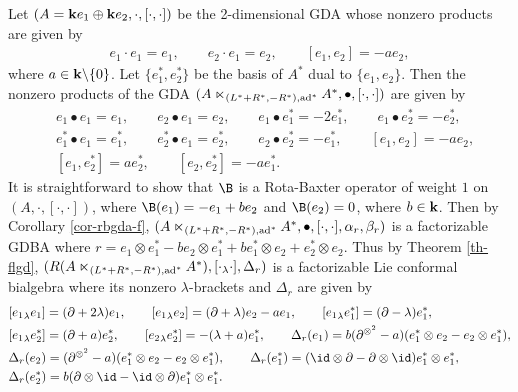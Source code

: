 \documentclass[12pt]{amsart}
\begin{document}
            \begin{example}
                Let $(A={\bf k}e_1\oplus{\bf k}e_2, \cdot,[\cdot,\cdot])$ be the 2-dimensional GDA whose nonzero products are given by
                \begin{align*}
                    e_1\cdot e_1=e_1,\qquad e_2\cdot e_1=e_2,\qquad [e_1,e_2]=-a e_2,
                \end{align*}
                where $a\in {\bf k}\backslash \{0\}$.  Let $\{e_1^*,e_2^*\}$ be the basis of $A^*$ dual to $\{e_1,e_2\}$. Then the nonzero products of  the GDA $(A\ltimes_{(L^*+R^*,-R^*),{\rm ad}^*}A^*, \bullet,[\cdot,\cdot])$ are given by
{\small                \begin{align*}
                    &e_1\bullet e_1=e_1,\qquad e_2\bullet e_1=e_2,\qquad e_1\bullet e_1^*=-2e_1^*,\qquad  e_1\bullet e_2^*=-e_2^*,\\
                    &e_1^*\bullet e_1=e_1^*,\qquad e_2^*\bullet e_1= e_2^*,\qquad e_2\bullet e_2^*=-e_1^*,\qquad [e_1,e_2]=-a e_2, \\
                    &[e_1,e_2^*]=ae_2^*,\qquad [e_2,e_2^*]=-ae_1^*.
                \end{align*}}
                It is straightforward to show that $\B$ is a Rota-Baxter operator of weight
                $1$ on $(A, \cdot,[\cdot,\cdot])$, where $\B(e_1)=-e_1+be_2$ and $\B(e_2)=0$, where $b\in {\bf k}$.
                Then by Corollary \ref{cor-rbgda-f},
                $(A\ltimes_{(L^*+R^*,-R^*),{\rm ad}^*}A^*, \bullet,[\cdot,\cdot],\alpha_r,\beta_r)$ is a factorizable GDBA where  $r=e_1\otimes e_1^*-b e_2\otimes e_1^*+b e_1^*\otimes e_2+e_2^*\otimes e_2$. Thus by Theorem \ref{th-flgd}, $(R(A\ltimes_{(L^*+R^*,-R^*),{\rm ad}^*}A^*),[\cdot_\lambda \cdot],\Delta_r )$ is a factorizable Lie conformal bialgebra where its nonzero $\lambda$-brackets and $\Delta_r$ are given by
                {\small
                \begin{align*}
                    &[{e_1}_\lambda e_1]=(\partial+2\lambda )e_1,\qquad [{e_1}_\lambda e_2]=(\partial+\lambda)e_2-ae_1,\qquad [{e_1}_\lambda e_1^*]=(\partial-\lambda )e_1^*,\\
                    &[{e_1}_\lambda e_2^*]=(\partial+a)e_2^*,\qquad [{e_2}_\lambda e_2^*]=-(\lambda+a)e_1^*,\qquad     \Delta_r (e_1)=b (\partial^{\otimes^2}-a)( e_1^*\otimes e_2 - e_2\otimes e_1^*),\\
                    &\Delta_r(e_2)=(\partial^{\otimes^2}-a)(e_1^*\otimes e_2-e_2\otimes e_1^*),\qquad \Delta_r(e_1^*)=(\id\otimes\partial -\partial\otimes \id)e_1^*\otimes e_1^*,\\
                    &\Delta_r(e_2^*)=b(\partial\otimes \id-\id\otimes \partial )e_1^*\otimes e_1^*.
                \end{align*}}
            \end{example}
\end{document}
